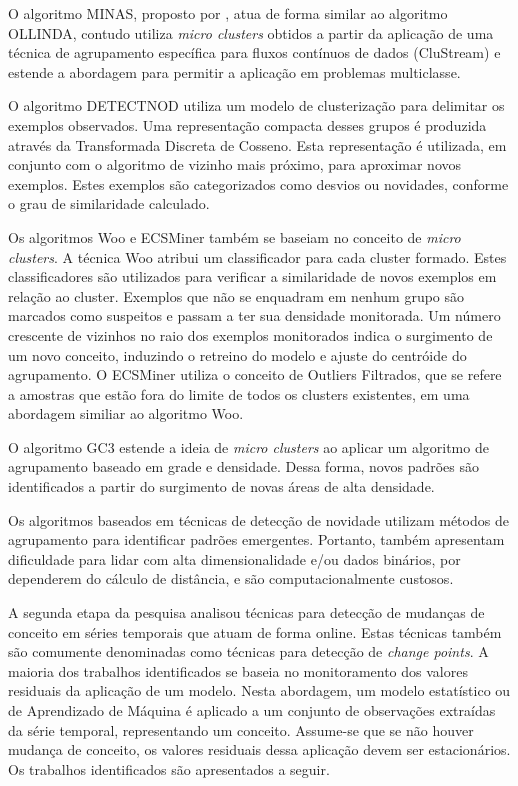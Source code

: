 \documentclass[msc, classic, a4paper]{ufbathesis}
\begin{document}
O algoritmo MINAS, proposto por , atua de forma similar ao algoritmo OLLINDA, contudo utiliza \textit{micro clusters} obtidos a partir da aplicação de uma técnica de agrupamento específica para fluxos contínuos de dados (CluStream) e estende a abordagem para permitir a aplicação em problemas multiclasse.

O algoritmo DETECTNOD \cite{Hashemi:Hayat:DETECTNOD:2010} utiliza um modelo de clusterização para delimitar os exemplos observados.
Uma representação compacta desses grupos é produzida através da Transformada Discreta de Cosseno. Esta representação é utilizada, em conjunto com o algoritmo de vizinho mais próximo, para aproximar novos exemplos.
Estes exemplos são categorizados como desvios ou novidades, conforme o grau de similaridade calculado.

Os algoritmos Woo \cite{Lee:Wang:Ryu:2007} e ECSMiner \cite{Masud:2011:CNC:1978259.1978529} também se baseiam no conceito de \textit{micro clusters}. A técnica Woo atribui um classificador para cada cluster formado. Estes classificadores são utilizados para verificar a similaridade de novos exemplos em relação ao cluster. Exemplos que não se enquadram em nenhum grupo são marcados como suspeitos e passam a ter sua densidade monitorada. Um número crescente de vizinhos no raio dos exemplos monitorados indica o surgimento de um novo conceito, induzindo o retreino do modelo e ajuste do centróide do agrupamento.
O ECSMiner \cite{Masud:2011:CNC:1978259.1978529} utiliza o conceito de Outliers Filtrados, que se refere a amostras que estão fora do limite de todos os clusters existentes, em uma abordagem similiar ao algoritmo Woo.

O algoritmo GC3 \cite{Sethi2016b:GC3} estende a ideia de \textit{micro clusters} ao aplicar um algoritmo de agrupamento baseado em grade e densidade. Dessa forma, novos padrões são identificados a partir do surgimento de novas áreas de alta densidade.

Os algoritmos baseados em técnicas de detecção de novidade utilizam métodos de agrupamento para identificar padrões emergentes. Portanto, também apresentam dificuldade para lidar com alta dimensionalidade e/ou dados binários, por dependerem do cálculo de distância, e são computacionalmente custosos.

A segunda etapa da pesquisa analisou técnicas para detecção de mudanças de conceito em séries temporais que atuam de forma online. Estas técnicas também são comumente denominadas como técnicas para detecção de \textit{change points}. A maioria dos trabalhos identificados se baseia no monitoramento dos valores residuais da aplicação de um modelo. Nesta abordagem, um modelo estatístico ou de Aprendizado de Máquina é aplicado a um conjunto de observações extraídas da série temporal, representando um conceito.
Assume-se que se não houver mudança de conceito, os valores residuais dessa aplicação devem ser estacionários. Os trabalhos identificados são apresentados a seguir.
\end{document}
